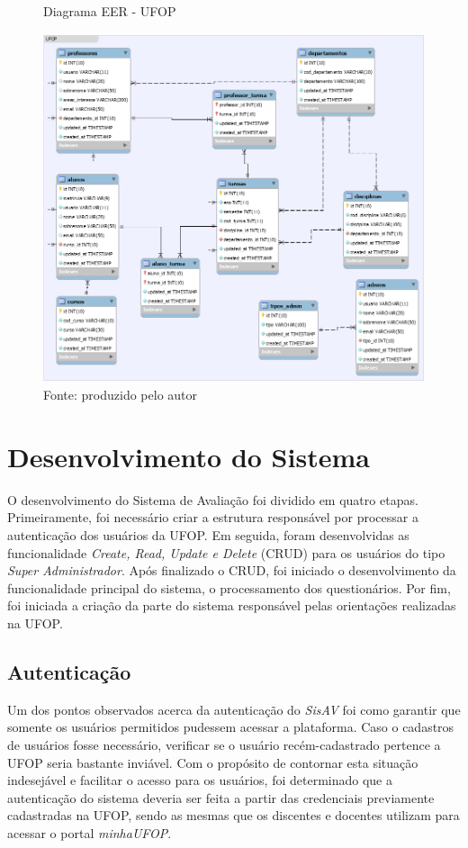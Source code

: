 \documentclass[
  12pt,       %
  openright,      %
  oneside,      %
  a4paper,      %
  english,      %
  french,        %
  spanish,     %
  brazil        %
  ]{abntex2-decsi}
\begin{document}
    \begin{figure}[h]
    \centering
    \caption{Diagrama EER - UFOP}
    \includegraphics[scale=0.8]{img/ufop_eer}
    \caption*{Fonte: produzido pelo autor}
    \label{fig:eer-ufop}
    \end{figure}

    \section{Desenvolvimento do Sistema}
    
    O desenvolvimento do Sistema de Avaliação foi dividido em quatro etapas. Primeiramente, foi necessário criar a estrutura responsável por processar a autenticação dos usuários da UFOP. Em seguida, foram desenvolvidas as funcionalidade \textit{Create, Read, Update e Delete} (CRUD) para os usuários do tipo \textit{Super Administrador}. Após finalizado o CRUD, foi iniciado o desenvolvimento da funcionalidade principal do sistema, o processamento dos questionários. Por fim, foi iniciada a criação da parte do sistema responsável pelas orientações realizadas na UFOP.
    
        \subsection{Autenticação}

    Um dos pontos observados acerca da autenticação do \textit{SisAV} foi como garantir que somente os usuários permitidos pudessem acessar a plataforma. Caso o cadastros de usuários fosse necessário, verificar se o usuário recém-cadastrado pertence a UFOP seria bastante inviável. Com o propósito de contornar esta situação indesejável e facilitar o acesso para os usuários, foi determinado que a autenticação do sistema deveria ser feita a partir das credenciais previamente cadastradas na UFOP, sendo as mesmas que os discentes e docentes utilizam para acessar o portal \textit{minhaUFOP}.
\end{document}
